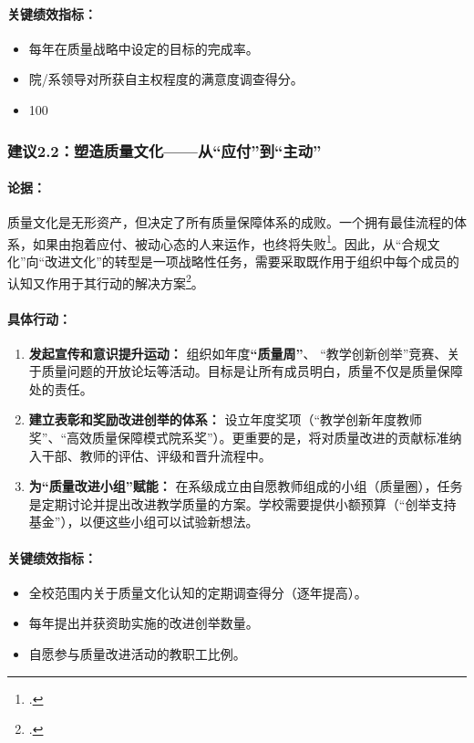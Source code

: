 \paragraph{关键绩效指标：}
\begin{itemize}
    \item 每年在质量战略中设定的目标的完成率。
    \item 院/系领导对所获自主权程度的满意度调查得分。
    \item 100%
\end{itemize}

\subsubsection{建议2.2：塑造质量文化——从“应付”到“主动”}

\paragraph{论据：}
质量文化是无形资产，但决定了所有质量保障体系的成败。一个拥有最佳流程的体系，如果由抱着应付、被动心态的人来运作，也终将失败\footcite{iosr_passiveparticipation}。因此，从“合规文化”向“改进文化”的转型是一项战略性任务，需要采取既作用于组织中每个成员的认知又作用于其行动的解决方案\footcite{HarveyStensaker2008}。

\paragraph{具体行动：}
\begin{enumerate}
    \item \textbf{发起宣传和意识提升运动：} 组织如年度\textbf{“质量周”}、 “教学创新创举”竞赛、关于质量问题的开放论坛等活动。目标是让所有成员明白，质量不仅是质量保障处的责任。
    \item \textbf{建立表彰和奖励改进创举的体系：} 设立年度奖项（“教学创新年度教师奖”、“高效质量保障模式院系奖”）。更重要的是，将对质量改进的贡献标准纳入干部、教师的评估、评级和晋升流程中。
    \item \textbf{为“质量改进小组”赋能：} 在系级成立由自愿教师组成的小组（质量圈），任务是定期讨论并提出改进教学质量的方案。学校需要提供小额预算（“创举支持基金”），以便这些小组可以试验新想法。
\end{enumerate}

\paragraph{关键绩效指标：}
\begin{itemize}
    \item 全校范围内关于质量文化认知的定期调查得分（逐年提高）。
    \item 每年提出并获资助实施的改进创举数量。
    \item 自愿参与质量改进活动的教职工比例。
\end{itemize}
















